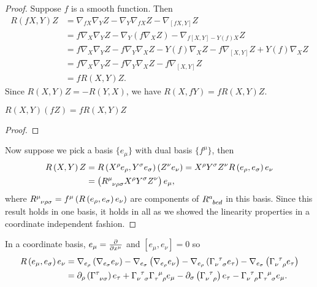 \begin{proof}
    Suppose $f$ is a smooth function. Then
    \begin{align}
        R \left( f X,Y \right) Z &= \nabla_{fX} \nabla_Y Z - \nabla_Y \nabla_{fX} Z - \nabla_{\left[ fX, Y \right] } Z \\
        &= f \nabla_{X} \nabla_Y Z - \nabla_Y \left( f \nabla_X Z \right) - \nabla_{f \left[ X, Y \right] - Y \left( f \right) X} Z  \\
        &= f \nabla_X \nabla_Y Z - f \nabla_Y \nabla_X Z - Y \left( f \right) \nabla_X Z - f \nabla_{\left[ X, Y \right] } Z + Y \left( f \right) \nabla_X Z \\
        &= f \nabla_X \nabla_Y Z - f \nabla_Y \nabla_X Z - f \nabla_{\left[ X, Y \right] } Z \\
        &= f R \left( X,Y \right) Z 
    .\end{align}
    Since $R \left( X,Y \right) Z = - R \left( Y,X \right) $, we have $R \left( X,fY \right) = f R \left( X,Y \right) Z$.
    \begin{exercise}
        $R \left( X,Y \right) \left( fZ \right) = f R \left( X,Y \right) Z$
    \end{exercise}
    \begin{proof}
        
    \end{proof}
    Now suppose we pick a basis $\{e_{\mu}\} $ with dual basis $\{ f^{\mu}\} $, then
    \begin{align}
        R \left( X,Y \right) Z &= R \left( X^{\rho} e_\rho, Y^{\sigma} e_{\sigma} \right) \left( Z^{\nu} e_\nu \right) = X^{\rho} Y^{\sigma} Z^{\nu} R \left( e_{\rho}, e_{\sigma} \right) e_{\nu} \\
        &= \left( \tensor{R}{^{\mu}_{\nu \rho \sigma}} X^{\rho} Y^{\sigma} Z^{\nu} \right) e_{\mu}
    ,\end{align}
    where $\tensor{R}{^{\mu}_{\nu \rho \sigma}} = f^{\mu} \left( R \left( e_{\rho}, e_{\sigma} \right) e_{\nu} \right) $ are components of $\tensor{R}{^{a}_{bcd}}$ in this basis. Since this result holds in one basis, it holds in all as we showed the linearity properties in a coordinate independent fashion.
\end{proof}

In a coordinate basis, $e_{\mu} = \pdv{x^{\mu}}$ and $\left[ e_{\mu}, e_{\nu} \right]  = 0$ so
\begin{align}
    R \left( e_\mu , e_{\sigma} \right) e_{\nu} &= \nabla_{e_{\rho}} \left( \nabla_{e_\sigma} e_{\nu} \right) - \nabla_{e_\sigma} \left( \nabla_{e_\rho} e_{\nu} \right)  - \nabla_{e_\rho} \left( \tensor{\Gamma}{_{\nu}^{\tau}_\sigma} e_{\tau} \right) - \nabla_{e_\sigma} \left( \tensor{\Gamma}{_{\nu}^{\tau}_{\rho}} e_{\tau} \right) \\
    &= \partial_\rho \left( \tensor{\Gamma}{^{\tau}_{\nu \sigma}} \right) e_{\tau} + \tensor{\Gamma}{_{\nu}^{\tau}_{\sigma}} \tensor{\Gamma}{_{\tau}^{\mu}_{\rho}} e_{\mu} - \partial_\sigma \left( \tensor{\Gamma}{_{\nu}^{\tau}_{\rho}} \right) e_{\tau} - \tensor{\Gamma}{_{\nu}^{\tau}_{\rho}} \tensor{\Gamma}{_{\tau}^{\mu}_{\sigma}} e_{\mu}
.\end{align}

